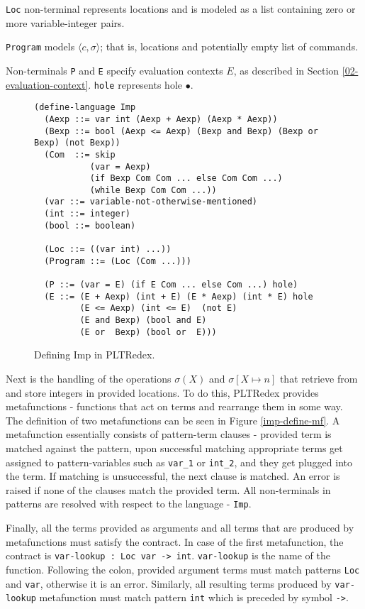 \texttt{Loc} non-terminal represents locations and is modeled as a list containing zero or more variable-integer pairs.

\texttt{Program} models $\langle c, \sigma \rangle$; that is, locations and potentially empty list of commands.

Non-terminals \texttt{P} and \texttt{E} specify evaluation contexts $E$, as described in Section \ref{02-evaluation-context}. \texttt{hole} represents hole $\bullet$.

\begin{figure}[h]
\begin{verbatim}
(define-language Imp
  (Aexp ::= var int (Aexp + Aexp) (Aexp * Aexp))
  (Bexp ::= bool (Aexp <= Aexp) (Bexp and Bexp) (Bexp or Bexp) (not Bexp))
  (Com  ::= skip
           (var = Aexp)
           (if Bexp Com Com ... else Com Com ...)
           (while Bexp Com Com ...))
  (var ::= variable-not-otherwise-mentioned)
  (int ::= integer)
  (bool ::= boolean)

  (Loc ::= ((var int) ...))
  (Program ::= (Loc (Com ...)))

  (P ::= (var = E) (if E Com ... else Com ...) hole)
  (E ::= (E + Aexp) (int + E) (E * Aexp) (int * E) hole
         (E <= Aexp) (int <= E)  (not E)
         (E and Bexp) (bool and E)
         (E or  Bexp) (bool or  E)))
\end{verbatim}
\caption{Defining Imp in PLTRedex.}
\label{imp-define-language}
\end{figure}

Next is the handling of the operations $\sigma(X)$ and $\sigma[X \mapsto n]$ that retrieve from and store integers in provided locations. To do this, PLTRedex provides metafunctions - functions that act on terms and rearrange them in some way. The definition of two metafunctions can be seen in Figure \ref{imp-define-mf}. A metafunction essentially consists of pattern-term clauses - provided term is matched against the pattern, upon successful matching appropriate terms get assigned to pattern-variables such as \texttt{var\_1} or \texttt{int\_2}, and they get plugged into the term. If matching is unsuccessful, the next clause is matched. An error is raised if none of the clauses match the provided term. All non-terminals in patterns are resolved with respect to the language - \texttt{Imp}.

Finally, all the terms provided as arguments and all terms that are produced by metafunctions must satisfy the contract. In case of the first metafunction, the contract is \texttt{var-lookup : Loc var -> int}. \texttt{var-lookup} is the name of the function. Following the colon, provided argument terms must match patterns \texttt{Loc} and \texttt{var}, otherwise it is an error. Similarly, all resulting terms produced by \texttt{var-lookup} metafunction must match pattern \texttt{int} which is preceded by symbol \texttt{->}.

